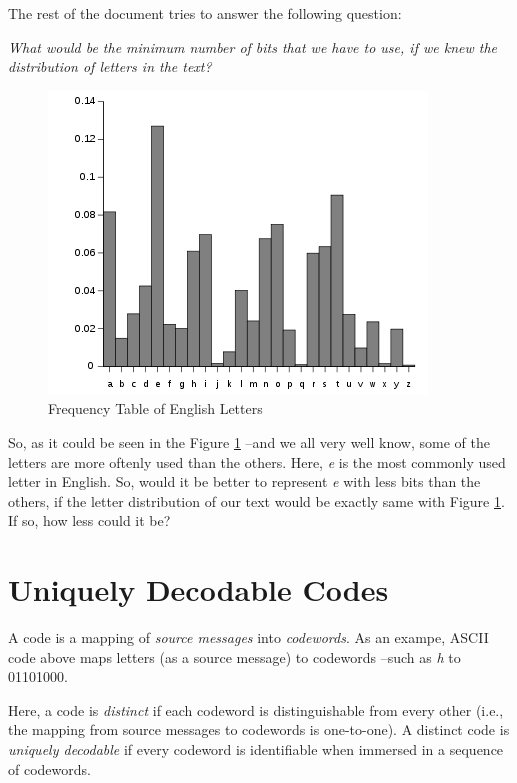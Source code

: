 \documentclass[11pt]{article}
\begin{document}
\newpage
The rest of the document tries to answer the following question:

\begin{center}
\textit{What would be the minimum number of bits that we have to use, if we knew the distribution of letters in the text?}
\end{center}

\begin{figure}[ht!]
\centering
\includegraphics[width=\linewidth]{img/english_histogram.png}
\caption{Frequency Table of English Letters \label{fig:letter_histogram}}
\end{figure}

So, as it could be seen in the Figure \ref{fig:letter_histogram} --and we all very well know, some of the letters are more oftenly used than the others. Here, \textit{e} is the most commonly used letter in English. So, would it be better to represent \textit{e} with less bits than the others, if the letter distribution of our text would be exactly same with Figure \ref{fig:letter_histogram}. If so, how less could it be?

\section{Uniquely Decodable Codes}
A code is a mapping of \textit{source messages} into \textit{codewords}. As an exampe, ASCII code above maps letters (as a source message) to codewords --such as \textit{h} to 01101000. 

Here, a code is \textit{distinct} if each codeword is distinguishable from every other (i.e., the mapping from source messages to codewords is one-to-one). A distinct code is \textit{uniquely decodable} if every codeword is identifiable when immersed in a sequence of codewords. 
\end{document}
